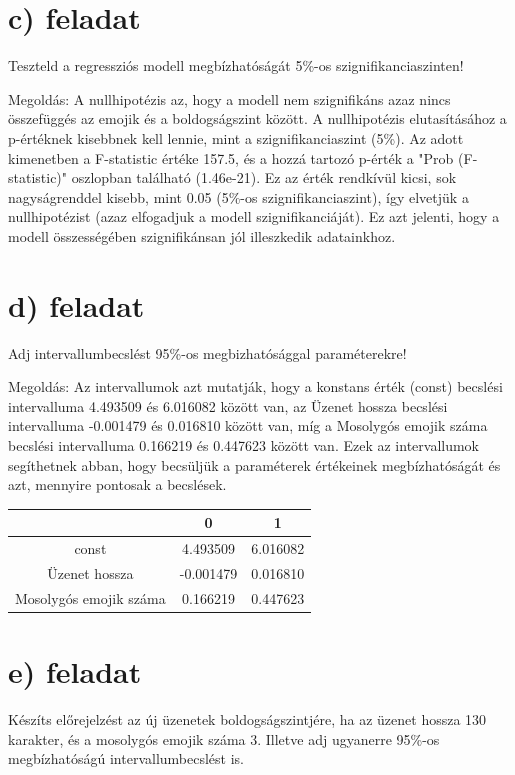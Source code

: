 \documentclass[11pt,a4paper,oneside]{report}
\begin{document}
\section{c) feladat}
Teszteld a regressziós modell megbízhatóságát 5\%-os szignifikanciaszinten!

Megoldás:
A nullhipotézis az, hogy a modell nem szignifikáns azaz nincs összefüggés az emojik és a boldogságszint között. A nullhipotézis elutasításához a p-értéknek kisebbnek kell lennie, mint a szignifikanciaszint (5\%).
Az adott kimenetben a F-statistic értéke 157.5, és a hozzá tartozó p-érték a "Prob (F-statistic)" oszlopban található (1.46e-21). Ez az érték rendkívül kicsi, sok nagyságrenddel kisebb, mint 0.05 (5\%-os szignifikanciaszint), így elvetjük a nullhipotézist (azaz elfogadjuk a modell szignifikanciáját). Ez azt jelenti, hogy a modell összességében szignifikánsan jól illeszkedik adatainkhoz.


\section{d) feladat}
Adj intervallumbecslést 95\%-os megbizhatósággal paraméterekre!

Megoldás:
Az intervallumok azt mutatják, hogy a konstans érték (const) becslési intervalluma 4.493509 és 6.016082 között van,
az Üzenet hossza becslési intervalluma -0.001479 és 0.016810 között van,
míg a Mosolygós emojik száma becslési intervalluma 0.166219 és 0.447623 között van.
Ezek az intervallumok segíthetnek abban, hogy becsüljük a paraméterek értékeinek megbízhatóságát és azt, mennyire pontosak a becslések.

\begin{tabular}{|c|c|c|}
  \hline
                         & 0         & 1        \\
  \hline
  const                  & 4.493509  & 6.016082 \\
  \hline
  Üzenet hossza          & -0.001479 & 0.016810 \\
  \hline
  Mosolygós emojik száma & 0.166219  & 0.447623 \\
  \hline
\end{tabular}




\section{e) feladat}
Készíts előrejelzést az új üzenetek boldogságszintjére, ha az üzenet hossza 130 karakter,  és a mosolygós emojik száma 3. Illetve adj ugyanerre 95\%-os megbízhatóságú intervallumbecslést is.
\end{document}
